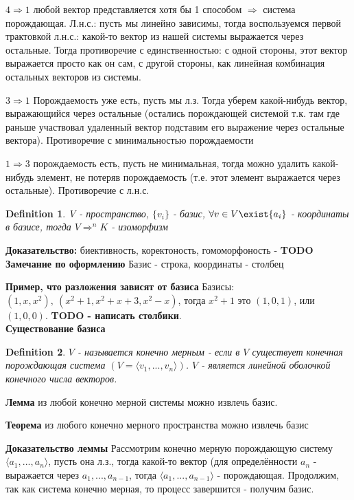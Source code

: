 \documentclass[12pt]{article}
\newtheorem{definition}{Definition}
\begin{document}
$4 \Rightarrow 1$ любой вектор представляется хотя бы 1 способом $\Rightarrow$ система порождающая. Л.н.с.: пусть мы линейно зависимы, тогда воспользуемся первой трактовкой л.н.с.: какой-то вектор из нашей системы выражается через остальные. Тогда противоречие с единственностью: с одной стороны, этот вектор выражается просто как он сам, с другой стороны, как линейная комбинация остальных векторов из системы.

$3 \Rightarrow 1$ Порождаемость уже есть, пусть мы л.з. Тогда уберем какой-нибудь вектор, выражающийся через остальные (остались порождающей системой т.к. там где раньше участвовал удаленный вектор подставим его выражение через остальные вектора). Противоречие с минимальностью порождаемости

$1 \Rightarrow 3$ порождаемость есть, пусть не минимальная, тогда можно удалить какой-нибудь элемент, не потеряв порождаемость (т.е. этот элемент выражается через остальные). Противоречие с л.н.с.


\begin{definition}
    V - пространство, $\{v_i\}$ - базис, $\forall v \in V \exist {a_i}$ - координаты в базисе, тогда $V \Rightarrow ^nK$ - изоморфизм
\end{definition} 
\textbf{Доказательство:} биективность, коректоность, гомоморфоность - \textbf{TODO}
\\

\textbf{Замечание по оформлению} Базис - строка, координаты - столбец

\textbf{Пример, что разложения зависят от базиса} Базисы: $(1, x, x^2),\ (x^2 + 1, x^2 + x + 3, x^2 - x)$, тогда $x^2 + 1$ это $(1, 0, 1)$, или $(1, 0, 0)$. \textbf{TODO - написать столбики}. \\


\textbf{Существование базиса}
\begin{definition}
    $V$ - называется конечно мерным - если в $V$ существует конечная порождающая система $(V=\langle v_1,...,v_n \rangle)$. $V$ - является линейной оболочкой конечного числа векторов.
\end{definition}

\textbf{Лемма} из любой конечно мерной системы можно извлечь базис.

\textbf{Теорема} из любого конечно мерного пространства можно извлечь базис

\textbf{Доказательство леммы} Рассмотрим конечно мерную порождающую систему $\langle a_1, ..., a_n \rangle$, пусть она л.з., тогда какой-то вектор (для определённости $a_n$ - выражается через $a_1, ..., a_{n - 1}$, тогда $\langle a_1, ..., a_{n - 1} \rangle$ - порождающая. Продолжим, так как система конечно мерная, то процесс завершится - получим базис. \\
\end{document}
